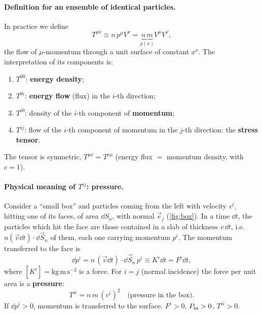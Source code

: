 \paragraph{Definition for an ensemble of identical particles.} In practice we define
\begin{equation}
  T^{\mu\nu}\equiv n\,p^\mu V^\nu=\underbrace{n\,m}_{\rho(x)}V^\mu V^\nu ,
\end{equation}
the flow of $\mu$-momentum through a unit surface of constant $x^\nu$. The interpretation of its components is:
\begin{enumerate}[label=(\roman*),nosep]
  \item $T^{00}$: \textbf{energy density};
  \item $T^{0i}$: \textbf{energy flow} (flux) in the $i$-th direction;
  \item $T^{i0}$: density of the $i$-th component of \textbf{momentum};
  \item $T^{ij}$: flow of the $i$-th component of momentum in the $j$-th direction: the \textbf{stress tensor}.
\end{enumerate}
The tensor is symmetric, $T^{\mu\nu}=T^{\nu\mu}$ (energy flux $=$ momentum density, with $c=1$).

\paragraph{Physical meaning of $T^{ij}$: pressure.} Consider a ``small box'' and particles coming from the left with velocity $v^i$, hitting one of its faces, of area $\dd S_n$, with normal $\vec e_j$ (\cref{fig:box}). In a time $\dd t$, the particles which hit the face are those contained in a slab of thickness $v\,\dd t$, i.e.\ $n(\vec v\dd t)\cdot\dd\vec S_n$ of them, each one carrying momentum $p^i$. The momentum transferred to the face is
\begin{equation}
  \dd p^i=n\,(\vec v\dd t)\cdot\dd\vec S_n\,p^i\equiv K^i\dd t=F^i\dd t ,
\end{equation}
where $[K^i]=\mathrm{kg\,m\,s^{-2}}$ is a force. For $i=j$ (normal incidence) the force per unit area is a \textbf{pressure}:
\begin{equation}
  T^{ii}=n\,m\,(v^i)^2\quad\text{(pressure in the box)}.
\end{equation}
If $\dd p^i>0$, momentum is transferred to the surface, $F^i>0$, $P_{\rm in}>0$, $T^{ii}>0$.

